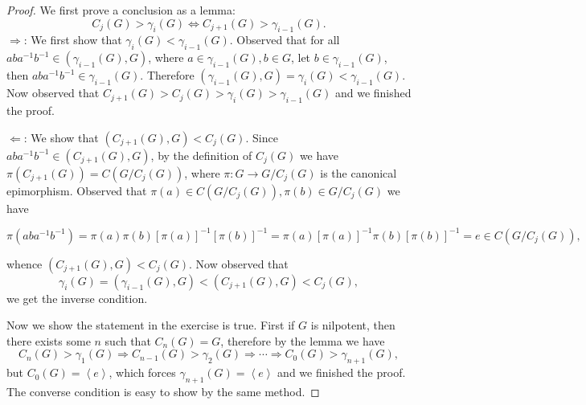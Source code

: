 \begin{proof}
We first prove a conclusion as a lemma:
$$
C_j\left( G \right) >\gamma _i\left( G \right) \Leftrightarrow C_{j+1}\left( G \right) >\gamma _{i-1}\left( G \right) .
$$
$\Rightarrow$: We first show that $\gamma _i\left( G \right) <\gamma _{i-1}\left( G \right) $. Observed that for all $aba^{-1}b^{-1}\in \left( \gamma _{i-1}\left( G \right) ,G \right) $, where $a\in \gamma _{i-1}\left( G \right) ,b\in G$, let $b\in \gamma _{i-1}\left( G \right) $, then $aba^{-1}b^{-1}\in \gamma _{i-1}\left( G \right) $. Therefore $\left( \gamma _{i-1}\left( G \right) ,G \right) =\gamma _i\left( G \right) <\gamma _{i-1}\left( G \right) $. Now observed that $C_{j+1}\left( G \right) >C_j\left( G \right) >\gamma _i\left( G \right) >\gamma _{i-1}\left( G \right) $ and we finished the proof.\par
$\Leftarrow$: We show that $\left( C_{j+1}\left( G \right) ,G \right) <C_j\left( G \right) $. Since $aba^{-1}b^{-1}\in \left( C_{j+1}\left( G \right) ,G \right) $, by the definition of $C_j(G)$ we have $\pi \left( C_{j+1}\left( G \right) \right) =C\left( G/C_j\left( G \right) \right) $, where $\pi:G\to G/C_j(G)$ is the canonical epimorphism. Observed that $\pi \left( a \right) \in C\left( G/C_j\left( G \right) \right) ,\pi \left( b \right) \in G/C_j\left( G \right) $ we have 
\begin{small}
$$
\pi \left( aba^{-1}b^{-1} \right) =\pi \left( a \right) \pi \left( b \right) \left[ \pi \left( a \right) \right] ^{-1}\left[ \pi \left( b \right) \right] ^{-1}=\pi \left( a \right) \left[ \pi \left( a \right) \right] ^{-1}\pi \left( b \right) \left[ \pi \left( b \right) \right] ^{-1}=e\in C\left( G/C_j\left( G \right) \right) ,
$$    
\end{small}
whence $\left( C_{j+1}\left( G \right) ,G \right) <C_j\left( G \right) $. Now observed that 
$$
\gamma _i\left( G \right) =\left( \gamma _{i-1}\left( G \right) ,G \right) <\left( C_{j+1}\left( G \right) ,G \right) <C_j\left( G \right) ,
$$
we get the inverse condition.\par
Now we show the statement in the exercise is true. First if $G$ is nilpotent, then there exists some $n$ such that $C_n(G)=G$, therefore by the lemma we have 
$$
C_n\left( G \right) >\gamma _1\left( G \right) \Rightarrow C_{n-1}\left( G \right) >\gamma _2\left( G \right) \Rightarrow \cdots \Rightarrow C_0\left( G \right) >\gamma _{n+1}\left( G \right) ,
$$
but $C_0(G)=\left<e\right>$, which forces $\gamma_{n+1}(G)=\left<e\right>$ and we finished the proof. The converse condition is easy to show by the same method.
\end{proof}
